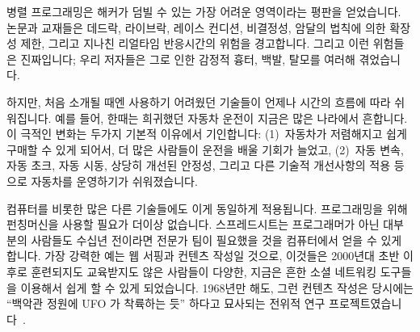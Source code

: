 
%

병렬 프로그래밍은 해커가 덤빌 수 있는 가장 어려운 영역이라는 평판을 얻었습니다.
논문과 교재들은 데드락, 라이브락, 레이스 컨디션, 비결정성, 암달의 법칙에 의한
확장성 제한, 그리고 지나친 리얼타임 반응시간의 위험을 경고합니다.
그리고 이런 위험들은 진짜입니다; 우리 저자들은 그로 인한 감정적 흉터, 백발,
탈모를 여러해 겪었습니다.

하지만, 처음 소개될 때엔 사용하기 어려웠던 기술들이 언제나 시간의 흐름에 따라
쉬워집니다.
예를 들어, 한때는 희귀했던 자동차 운전이 지금은 많은 나라에서 흔합니다.
이 극적인 변화는 두가지 기본적 이유에서 기인합니다: (1)~자동차가 저렴해지고
쉽게 구매할 수 있게 되어서, 더 많은 사람들이 운전을 배울 기회가 늘었고,
(2)~자동 변속, 자동 초크, 자동 시동, 상당히 개선된 안정성, 그리고 다른 기술적
개선사항의 적용 등으로 자동차를 운영하기가 쉬워졌습니다.

컴퓨터를 비롯한 많은 다른 기술들에도 이게 동일하게 적용됩니다.
프로그래밍을 위해 펀칭머신을 사용할 필요가 더이상 없습니다.
스프레드시트는 프로그래머가 아닌 대부분의 사람들도 수십년 전이라면 전문가 팀이
필요했을 것을 컴퓨터에서 얻을 수 있게 합니다.
가장 강력한 예는 웹 서핑과 컨텐츠 작성일 것으로, 이것들은 2000년대 초반 이후로
훈련되지도 교육받지도 않은 사람들이 다양한, 지금은 흔한 소셜 네트워킹 도구들을
이용해서 쉽게 할 수 있게 되었습니다.
1968년만 해도, 그런 컨텐츠 작성은 당시에는 ``백악관 정원에 UFO 가 착륙하는
듯''\cite{ScottGriffen2000} 하다고 묘사되는 전위적 연구
프로젝트였습니다~\cite{DouglasEngelbart1968}.

